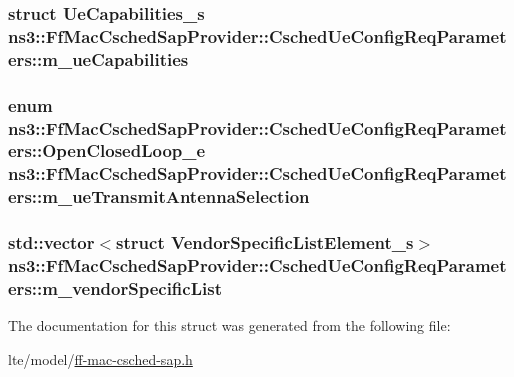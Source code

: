 \subsubsection[{\texorpdfstring{m\+\_\+ue\+Capabilities}{m_ueCapabilities}}]{\setlength{\rightskip}{0pt plus 5cm}struct {\bf Ue\+Capabilities\+\_\+s} ns3\+::\+Ff\+Mac\+Csched\+Sap\+Provider\+::\+Csched\+Ue\+Config\+Req\+Parameters\+::m\+\_\+ue\+Capabilities}\hypertarget{structns3_1_1FfMacCschedSapProvider_1_1CschedUeConfigReqParameters_a85f204fb96f74716cd622d3e46adc8c8}{}\label{structns3_1_1FfMacCschedSapProvider_1_1CschedUeConfigReqParameters_a85f204fb96f74716cd622d3e46adc8c8}
\subsubsection[{\texorpdfstring{m\+\_\+ue\+Transmit\+Antenna\+Selection}{m_ueTransmitAntennaSelection}}]{\setlength{\rightskip}{0pt plus 5cm}enum {\bf ns3\+::\+Ff\+Mac\+Csched\+Sap\+Provider\+::\+Csched\+Ue\+Config\+Req\+Parameters\+::\+Open\+Closed\+Loop\+\_\+e}  ns3\+::\+Ff\+Mac\+Csched\+Sap\+Provider\+::\+Csched\+Ue\+Config\+Req\+Parameters\+::m\+\_\+ue\+Transmit\+Antenna\+Selection}\hypertarget{structns3_1_1FfMacCschedSapProvider_1_1CschedUeConfigReqParameters_a080a3f48af91e06339b9ab64c7206c44}{}\label{structns3_1_1FfMacCschedSapProvider_1_1CschedUeConfigReqParameters_a080a3f48af91e06339b9ab64c7206c44}
\subsubsection[{\texorpdfstring{m\+\_\+vendor\+Specific\+List}{m_vendorSpecificList}}]{\setlength{\rightskip}{0pt plus 5cm}std\+::vector$<$struct {\bf Vendor\+Specific\+List\+Element\+\_\+s}$>$ ns3\+::\+Ff\+Mac\+Csched\+Sap\+Provider\+::\+Csched\+Ue\+Config\+Req\+Parameters\+::m\+\_\+vendor\+Specific\+List}\hypertarget{structns3_1_1FfMacCschedSapProvider_1_1CschedUeConfigReqParameters_a9a9448cba2dad5527efc4db1d6f43c6d}{}\label{structns3_1_1FfMacCschedSapProvider_1_1CschedUeConfigReqParameters_a9a9448cba2dad5527efc4db1d6f43c6d}


The documentation for this struct was generated from the following file\+:\begin{DoxyCompactItemize}
\item 
lte/model/\hyperlink{ff-mac-csched-sap_8h}{ff-\/mac-\/csched-\/sap.\+h}\end{DoxyCompactItemize}
